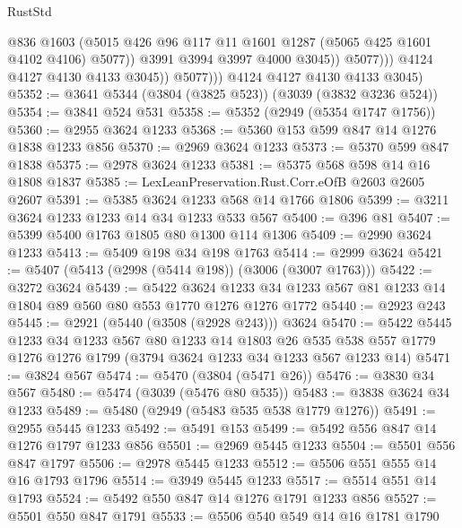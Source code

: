 \begin{lexlean}{RustStd}
\begin{coremodule}
                            @836
                            @1603
                            (@5015
                              @426
                              @96
                              @117
                              @11
                              @1601
                              @1287
                              (@5065 @425 @1601 @4102 @4106)
                              @5077))
                          @3991
                          @3994
                          @3997
                          @4000
                          @3045))
                      @5077)))
                @4124
                @4127
                @4130
                @4133
                @3045))
            @5077)))
      @4124
      @4127
      @4130
      @4133
      @3045)
@5352 := @3641 @5344 (@3804 (@3825 @523)) (@3039 (@3832 @3236 @524))
@5354 := @3841 @524 @531
@5358 := @5352 (@2949 (@5354 @1747 @1756))
@5360 := @2955 @3624 @1233
@5368 := @5360 @153 @599 @847 @14 @1276 @1838 @1233 @856
@5370 := @2969 @3624 @1233
@5373 := @5370 @599 @847 @1838
@5375 := @2978 @3624 @1233
@5381 := @5375 @568 @598 @14 @16 @1808 @1837
@5385 := LexLeanPreservation.Rust.Corr.eOfB @2603 @2605 @2607
@5391 := @5385 @3624 @1233 @568 @14 @1766 @1806
@5399 := @3211 @3624 @1233 @1233 @14 @34 @1233 @533 @567
@5400 := @396 @81
@5407 := @5399 @5400 @1763 @1805 @80 @1300 @114 @1306
@5409 := @2990 @3624 @1233
@5413 := @5409 @198 @34 @198 @1763
@5414 := @2999 @3624
@5421 := @5407 (@5413 (@2998 (@5414 @198)) (@3006 (@3007 @1763)))
@5422 := @3272 @3624
@5439 := @5422
    @3624
    @1233
    @34
    @1233
    @567
    @81
    @1233
    @14
    @1804
    @89
    @560
    @80
    @553
    @1770
    @1276
    @1276
    @1772
@5440 := @2923 @243
@5445 := @2921 (@5440 (@3508 (@2928 @243))) @3624
@5470 := @5422
    @5445
    @1233
    @34
    @1233
    @567
    @80
    @1233
    @14
    @1803
    @26
    @535
    @538
    @557
    @1779
    @1276
    @1276
    @1799
    (@3794 @3624 @1233 @34 @1233 @567 @1233 @14)
@5471 := @3824 @567
@5474 := @5470 (@3804 (@5471 @26))
@5476 := @3830 @34 @567
@5480 := @5474 (@3039 (@5476 @80 @535))
@5483 := @3838 @3624 @34 @1233
@5489 := @5480 (@2949 (@5483 @535 @538 @1779 @1276))
@5491 := @2955 @5445 @1233
@5492 := @5491 @153
@5499 := @5492 @556 @847 @14 @1276 @1797 @1233 @856
@5501 := @2969 @5445 @1233
@5504 := @5501 @556 @847 @1797
@5506 := @2978 @5445 @1233
@5512 := @5506 @551 @555 @14 @16 @1793 @1796
@5514 := @3949 @5445 @1233
@5517 := @5514 @551 @14 @1793
@5524 := @5492 @550 @847 @14 @1276 @1791 @1233 @856
@5527 := @5501 @550 @847 @1791
@5533 := @5506 @540 @549 @14 @16 @1781 @1790

\end{coremodule}
\end{lexlean}
